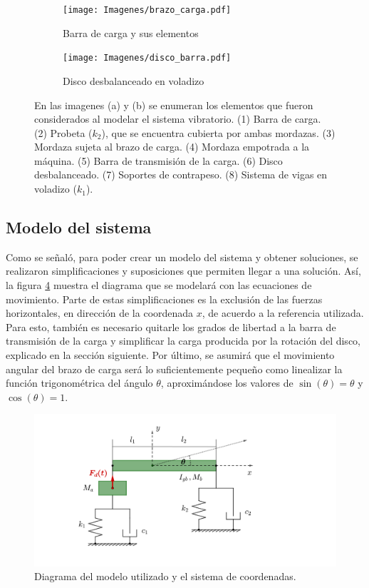 \begin{figure}[p]
\centering
	\begin{subfigure}{1\linewidth}
		\centering
		\texttt{[image: Imagenes/brazo\_carga.pdf]}
		\caption{Barra de carga y sus elementos}\label{fig:elementos_brazo}
	\end{subfigure}
	\begin{subfigure}{1\linewidth}
		\centering
		\texttt{[image: Imagenes/disco\_barra.pdf]}
		\caption{Disco desbalanceado en voladizo}\label{fig:elementos_disco}
	\end{subfigure}
\caption{En las imagenes (a) y (b) se enumeran los elementos que fueron considerados al modelar el sistema vibratorio. (1) Barra de carga. (2) Probeta ($k_2$), que se encuentra cubierta por ambas mordazas. (3) Mordaza sujeta al brazo de carga. (4) Mordaza empotrada a la máquina. (5) Barra de transmisión de la carga. (6) Disco desbalanceado. (7) Soportes de contrapeso. (8) Sistema de vigas en voladizo ($k_1$).}
\label{fig:elementos_modelo}
\end{figure}

\subsection{Modelo del sistema}
\label{sec:mod_sist}
Como se señaló, para poder crear un modelo del sistema y obtener soluciones, se realizaron simplificaciones y suposiciones que permiten llegar a una solución. Así, la figura \ref{fig:diag_modelo} muestra el diagrama que se modelará con las ecuaciones de movimiento. Parte de estas simplificaciones es la exclusión de las fuerzas horizontales, en dirección de la coordenada $x$, de acuerdo a la referencia utilizada. Para esto, también es necesario quitarle los grados de libertad a la barra de transmisión de la carga y simplificar la carga producida por la rotación del disco, explicado en la sección siguiente. Por último, se asumirá que el movimiento angular del brazo de carga será lo suficientemente pequeño como linealizar la función trigonométrica del ángulo $\theta$, aproximándose los valores de $\sin(\theta) = \theta$ y $\cos(\theta)=1$.

\begin{figure}[h]
\centering
\includegraphics[width=0.9\linewidth, trim={5cm 2cm 10cm 1cm}, clip]{Imagenes/mach_diag.pdf}
\caption{Diagrama del modelo utilizado y el sistema de coordenadas.}
\label{fig:diag_modelo}
\end{figure}

